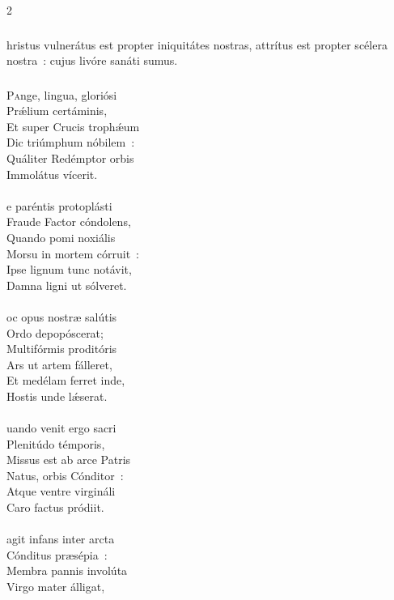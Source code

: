 \documentclass[9pt,twoside]{extarticle}
\begin{document}
\begin{multicols}{2}
{{\subsubsection*{}
hristus vulnerátus est propter iniquitátes nostras, attrítus est propter scélera nostra~: cujus livóre sanáti sumus.

\subsubsection*{\center {}}
\lettrine{P}ange, lingua, gloriósi\\
Prǽlium certáminis,\\
Et super Crucis trophǽum\\
Dic triúmphum nóbilem~:\\
Quáliter Redémptor orbis\\
Immolátus vícerit.\\
\\
e paréntis protoplásti\\
Fraude Factor cóndolens,\\
Quando pomi noxiális\\
Morsu in mortem córruit~:\\
Ipse lignum tunc notávit,\\
Damna ligni ut sólveret.\\
\\
oc opus nostræ salútis\\
Ordo depopóscerat;\\
Multifórmis proditóris\\
Ars ut artem fálleret,\\
Et medélam ferret inde,\\
Hostis unde lǽserat.\\
\\
uando venit ergo sacri\\
Plenitúdo témporis,\\
Missus est ab arce Patris\\
Natus, orbis Cónditor~:\\
Atque ventre virgináli\\
Caro factus pródiit.\\
\\
agit infans inter arcta\\
Cónditus præsépia~:\\
Membra pannis involúta\\
Virgo mater álligat,\\
}}
\end{multicols}
\end{document}
